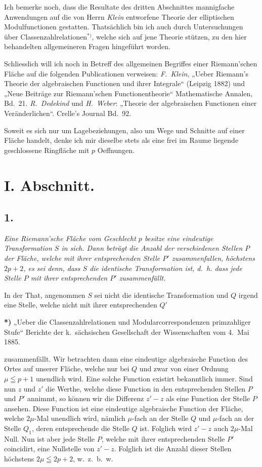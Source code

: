\documentclass{article}
\begin{document}
Ich bemerke noch, dass die Resultate des dritten Abschnittes mannigfache Anwendungen auf die von Herrn \emph{Klein} entworfene Theorie der elliptischen Modulfunctionen gestatten. Thatsächlich bin ich auch durch Untersuchungen über Classenzahlrelationen${}^{*)}$, welche sich auf jene Theorie stützen, zu den hier behandelten allgemeineren Fragen hingeführt worden.

Schliesslich will ich noch in Betreff des allgemeinen Begriffes einer Riemann'schen Fläche auf die folgenden Publicationen verweisen: \emph{F.~Klein}, „Ueber Riemann's Theorie der algebraischen Functionen und ihrer Integrale“ (Leipzig 1882) und „Neue Beiträge zur Riemann'schen Functionentheorie“ Mathematische Annalen, Bd.~21. \emph{R.~Dedekind} und \emph{H.~Weber}: „Theorie der algebraischen Functionen einer Veränderlichen“. Crelle's Journal Bd.~92.

Soweit es sich nur um Lagebeziehungen, also um Wege und Schnitte auf einer Fläche handelt, denke ich mir dieselbe stets als eine frei im Raume liegende geschlossene Ringfläche mit $p$ Oeffnungen.

\section*{I. Abschnitt.}

\subsection*{1.}

\emph{Eine Riemann'sche Fläche vom Geschlecht $p$ besitze eine eindeutige Transformation $S$ in sich. Dann beträgt die Anzahl der verschiedenen Stellen $P$ der Fläche, welche mit ihrer entsprechenden Stelle $P'$ zusammenfallen, höchstens $2p+2$, es sei denn, dass $S$ die identische Transformation ist, d.~h. dass jede Stelle $P$ mit ihrer entsprechenden $P'$ zusammenfällt.}

In der That, angenommen $S$ sei nicht die identische Transformation und $Q$ irgend eine Stelle, welche nicht mit ihrer entsprechenden $Q'$

\textbf{*)} „Ueber die Classenzahlrelationen und Modularcorrespondenzen primzahliger Stufe“ Berichte der k.~sächsischen Gesellschaft der Wissenschaften vom 4.~Mai 1885.

zusammenfällt. Wir betrachten dann eine eindeutige algebraische Function des Ortes auf unserer Fläche, welche nur bei $Q$ und zwar von einer Ordnung $\mu \leqq p+1$ unendlich wird. Eine solche Function existirt bekanntlich immer. Sind nun $z$ und $z'$ die Werthe, welche diese Function in den entsprechenden Stellen $P$ und $P'$ annimmt, so können wir die Differenz $z' - z$ als eine Function der Stelle $P$ ansehen. Diese Function ist eine eindeutige algebraische Function der Fläche, welche $2\mu$-Mal unendlich wird, nämlich $\mu$-fach an der Stelle $Q$ und $\mu$-fach an der Stelle $Q_1$, deren entsprechende die Stelle $Q$ ist. Folglich wird $z' - z$ auch $2\mu$-Mal Null. Nun ist aber jede Stelle $P$, welche mit ihrer entsprechenden Stelle $P'$ coincidirt, eine Nullstelle von $z' - z$. Folglich ist die Anzahl dieser Stellen höchstens $2\mu \leqq 2p+2$, w.~z.~b.~w.
\end{document}
